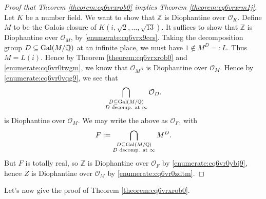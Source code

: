 \documentclass[reqno]{amsart} 
\begin{document}
\begin{proof}[Proof that Theorem \ref{theorem:cq6vrxrob0} implies Theorem \ref{theorem:cq6vrxrm1j}]
  Let $K$ be a number field.  We want to show that $\mathbb{Z}$ is Diophantine over $\mathcal{O}_K$.  Define $M$ to be the Galois closure of $K(i, \sqrt{2}, \dotsc, \sqrt{13})$.  It suffices to show that $\mathbb{Z}$ is Diophantine over $\mathcal{O}_M$, by \eqref{enumerate:cq6vrx9ccs}.  Taking the decomposition group $D \subseteq \operatorname{Gal}(M / \mathbb{Q})$ at an infinite place, we must have $1 \notin M^D =: L$.  Thus $M = L(i)$.  Hence by Theorem \ref{theorem:cq6vrxrob0} and \eqref{enumerate:cq6vr0twgm}, we know that $\mathcal{O}_{M^D}$ is Diophantine over $\mathcal{O}_M$.  Hence by \eqref{enumerate:cq6vr0vqg9}, we see that
  \begin{equation*}
    \bigcap_{
      \substack{
        D \subseteq \operatorname{Gal}(M / \mathbb{Q})  \\
        D \text{ decomp. at } \infty
      }
    }
    \mathcal{O}_D.
  \end{equation*}
  is Diophantine over $\mathcal{O}_M$.  We may write the above as $\mathcal{O}_F$, with
  \begin{equation*}
    F := \bigcap_{
      \substack{
        D \subseteq \operatorname{Gal}(M / \mathbb{Q})  \\
        D \text{ decomp. at } \infty
      }        
    }
    M^D.
  \end{equation*}
  But $F$ is totally real, so $\mathbb{Z}$ is Diophantine over $\mathcal{O}_F$ by \eqref{enumerate:cq6vr0ybj9}, hence $Z$ is Diophantine over $\mathcal{O}_M$ by \eqref{enumerate:cq6vr0zdtm}.
\end{proof}

Let's now give the proof of Theorem \ref{theorem:cq6vrxrob0}.
\end{document}
